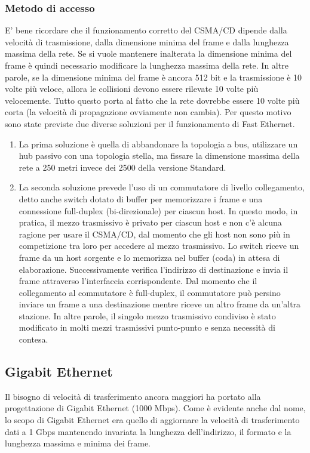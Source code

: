 \subsubsection{Metodo di accesso}
E' bene ricordare che il funzionamento corretto del CSMA/CD dipende dalla velocità di trasmissione, dalla dimensione minima del frame e dalla lunghezza massima della rete. Se si vuole mantenere inalterata la dimensione minima del frame è quindi necessario modificare la lunghezza massima della rete. In altre parole, se la dimensione minima del frame è ancora 512 bit e la trasmissione è 10 volte più veloce, allora le collisioni devono essere rilevate 10 volte più velocemente. Tutto questo porta al fatto che la rete dovrebbe essere 10 volte più corta (la velocità di propagazione ovviamente non cambia). Per questo motivo sono state previste due diverse soluzioni per il funzionamento di Fast Ethernet.
\begin{enumerate}
    \item La prima soluzione è quella di abbandonare la topologia a bus, utilizzare un hub passivo con una topologia stella, ma fissare la dimensione massima della rete a 250 metri invece dei 2500 della versione Standard.
    \item La seconda soluzione prevede l'uso di un commutatore di livello collegamento, detto anche switch dotato di buffer per memorizzare i frame e una connessione full-duplex (bi-direzionale) per ciascun host. In questo modo, in pratica, il mezzo trasmissivo è privato per ciascun host e non c'è alcuna ragione per usare il CSMA/CD, dal momento che gli host non sono più in competizione tra loro per accedere al mezzo trasmissivo. Lo switch riceve un frame da un host sorgente e lo memorizza nel buffer (coda) in attesa di elaborazione. Successivamente verifica l'indirizzo di destinazione e invia il frame attraverso l'interfaccia corrispondente. Dal momento che il collegamento al commutatore è full-duplex, il commutatore può persino inviare un frame a una destinazione mentre riceve un altro frame da un'altra stazione. In altre parole, il singolo mezzo trasmissivo condiviso è stato modificato in molti mezzi trasmissivi punto-punto e senza necessità di contesa.
\end{enumerate}

\subsection{Gigabit Ethernet}
Il bisogno di velocità di trasferimento ancora maggiori ha portato alla progettazione di Gigabit Ethernet (1000 Mbps). Come è evidente anche dal nome, lo scopo di Gigabit Ethernet era quello di aggiornare la velocità di trasferimento dati a 1 Gbps mantenendo invariata la lunghezza dell'indirizzo, il formato e la lunghezza massima e minima dei frame.

